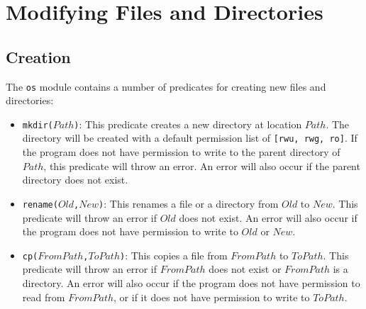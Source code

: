 \section{Modifying Files and Directories}

\subsection{Creation}
The \texttt{os} module contains a number of predicates for creating new files and directories:
\begin{itemize}
\item \texttt{mkdir($Path$)}: This predicate creates a new directory at location $Path$.  The directory will be created with a default permission list of \texttt{[rwu, rwg, ro]}.  If the program does not have permission to write to the parent directory of $Path$, this predicate will throw an error.  An error will also occur if the parent directory does not exist.  

\item \texttt{rename($Old$,$New$)}: This renames a file or a directory from $Old$ to $New$.  This predicate will throw an error if $Old$ does not exist.  An error will also occur if the program does not have permission to write to $Old$ or $New$.

\item \texttt{cp($FromPath$,$ToPath$)}: This copies a file from $FromPath$ to $ToPath$.  This predicate will throw an error if $FromPath$ does not exist or $FromPath$ is a directory.  An error will also occur if the program does not have permission to read from $FromPath$, or if it does not have permission to write to $ToPath$.

\end{itemize}


